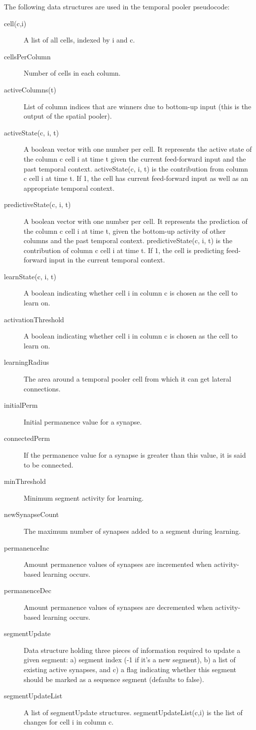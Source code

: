 The following data structures are used in the temporal pooler pseudocode:

\begin{description}
\item[cell(c,i)] A list of all cells, indexed by i and c.
\item[cellsPerColumn] Number of cells in each column.
\item[activeColumns(t)] List of column indices that are winners due to
  bottom-up input (this is the output of the spatial pooler).
\item[activeState(c, i, t)] A boolean vector with one number per
  cell. It represents the active state of the column c cell i at time
  t given the current feed-forward input and the past temporal
  context. activeState(c, i, t) is the contribution from column c cell
  i at time t. If 1, the cell has current feed-forward input as well
  as an appropriate temporal context.
\item[predictiveState(c, i, t)] A boolean vector with one number per
  cell. It represents the prediction of the column c cell i at time t,
  given the bottom-up activity of other columns and the past temporal
  context. predictiveState(c, i, t) is the contribution of column c
  cell i at time t. If 1, the cell is predicting feed-forward input in
  the current temporal context.
\item[learnState(c, i, t)] A boolean indicating whether cell i in
  column c is chosen as the cell to learn on.
\item[activationThreshold] A boolean indicating whether cell i in
  column c is chosen as the cell to learn on.
\item[learningRadius] The area around a temporal pooler cell from
  which it can get lateral connections.
\item[initialPerm] Initial permanence value for a synapse.
\item[connectedPerm] If the permanence value for a synapse is greater
  than this value, it is said to be connected.
\item[minThreshold] Minimum segment activity for learning.
\item[newSynapseCount] The maximum number of synapses added to a
  segment during learning.
\item[permanenceInc] Amount permanence values of synapses are
  incremented when activity-based learning occurs.
\item[permanenceDec] Amount permanence values of synapses are
  decremented when activity-based learning occurs.
\item[segmentUpdate] Data structure holding three pieces of
  information required to update a given segment: a) segment index (-1
  if it's a new segment), b) a list of existing active synapses, and
  c) a flag indicating whether this segment should be marked as a
  sequence segment (defaults to false).
\item[segmentUpdateList] A list of segmentUpdate
  structures. segmentUpdateList(c,i) is the list of changes for cell i
  in column c.
\end{description}

